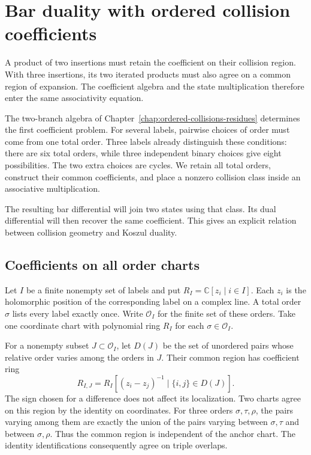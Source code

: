 \chapter{Bar duality with ordered collision coefficients}
\label{chap:ordered-coefficient-bar}

A product of two insertions must retain the coefficient on their
collision region. With three insertions, its two iterated products
must also agree on a common region of expansion. The coefficient
algebra and the state multiplication therefore enter the same
associativity equation.

The two-branch algebra of
Chapter~\ref{chap:ordered-collisions-residues} determines the first
coefficient problem. For several labels, pairwise choices of order
must come from one total order. Three labels already distinguish
these conditions: there are six total orders, while three independent
binary choices give eight possibilities. The two extra choices are
cycles. We retain all total orders, construct their common
coefficients, and place a nonzero collision class inside an
associative multiplication.

The resulting bar differential will join two states using that
class. Its dual differential will then recover the same coefficient.
This gives an explicit relation between collision geometry and
Koszul duality.

\section{Coefficients on all order charts}

Let $I$ be a finite nonempty set of labels and put
$R_I=\mathbb C[z_i\mid i\in I]$.
Each $z_i$ is the holomorphic position of the corresponding label
on a complex line. A total order $\sigma$ lists every label exactly
once. Write $\mathcal O_I$ for the finite set of these orders.
Take one coordinate chart with polynomial ring $R_I$ for each
$\sigma\in\mathcal O_I$.

For a nonempty subset $J\subset\mathcal O_I$, let $D(J)$ be the set
of unordered pairs whose relative order varies among the orders in
$J$. Their common region has coefficient ring
\[
 R_{I,J}=R_I[(z_i-z_j)^{-1}\mid\{i,j\}\in D(J)].
\]
The sign chosen for a difference does not affect its localization.
Two charts agree on this region by the identity on coordinates.
For three orders $\sigma,\tau,\rho$, the pairs varying among them
are exactly the union of the pairs varying between $\sigma,\tau$
and between $\sigma,\rho$.
Thus the common region is independent of the anchor chart.
The identity identifications consequently agree on triple overlaps.

